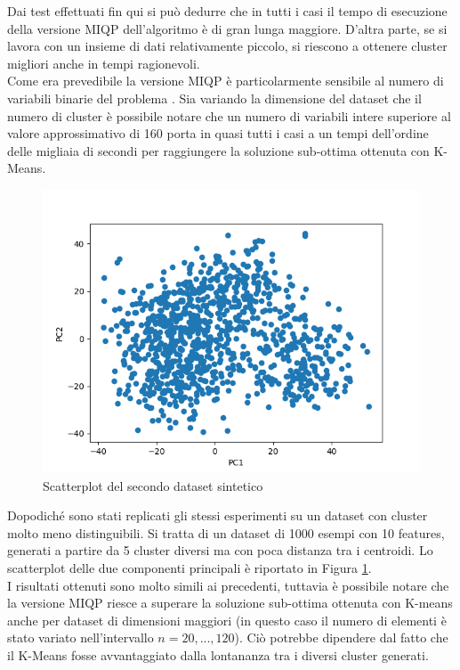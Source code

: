 \documentclass{article}
\begin{document}
    Dai test effettuati fin qui si può dedurre che in tutti i casi il tempo di esecuzione della versione MIQP dell'algoritmo è di gran lunga maggiore. D'altra parte, se si lavora con un insieme di dati relativamente piccolo, si riescono a ottenere cluster migliori anche in tempi ragionevoli.\\
    Come era prevedibile la versione MIQP è particolarmente sensibile al numero di variabili binarie del problema \cite{lapucci}. Sia variando la dimensione del dataset che il numero di cluster è possibile notare che un numero di variabili intere superiore al valore approssimativo di 160 porta in quasi tutti i casi a un tempi dell'ordine delle migliaia di secondi per raggiungere la soluzione sub-ottima ottenuta con K-Means.\\

    \begin{figure}
    \includegraphics[width=1\linewidth]{../results/plots/dataset2}
    \caption{Scatterplot del secondo dataset sintetico}
    \label{sint_sint}
    \end{figure}
    Dopodiché sono stati replicati gli stessi esperimenti su un dataset con cluster molto meno distinguibili. Si tratta di un dataset di 1000 esempi con 10 features, generati a partire da 5 cluster diversi ma con poca distanza tra i centroidi. Lo scatterplot delle due componenti principali è riportato in Figura \ref{sint_sint}.\\
    I risultati ottenuti sono molto simili ai precedenti, tuttavia è possibile notare che la versione MIQP riesce a superare la soluzione sub-ottima ottenuta con K-means anche per dataset di dimensioni maggiori (in questo caso il numero di elementi è stato variato nell'intervallo $n=20,...,120$). Ciò potrebbe dipendere dal fatto che il K-Means fosse avvantaggiato dalla lontananza tra i diversi cluster generati.\\
\end{document}
